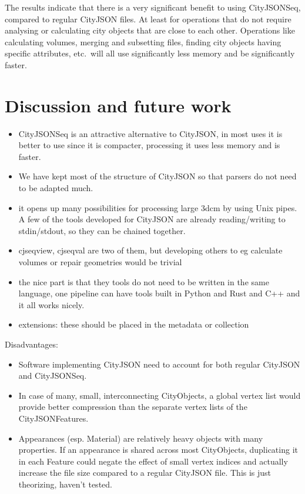 \documentclass{isprs} %
\begin{document}
The results indicate that there is a very significant benefit to using CityJSONSeq, compared to regular CityJSON files.
At least for operations that do not require analysing or calculating city objects that are close to each other.
Operations like calculating volumes, merging and subsetting files, finding city objects having specific attributes, etc.\ will all use significantly less memory and be significantly faster.


%
\section{Discussion and future work}%
\label{sec:discussion}

\begin{itemize}
  \item CityJSONSeq is an attractive alternative to CityJSON, in most uses it is better to use since it is compacter, processing it uses less memory and is faster.
  \item We have kept most of the structure of CityJSON so that parsers do not need to be adapted much.
  \item it opens up many possibilities for processing large 3dcm by using Unix pipes. A few of the tools developed for CityJSON are already reading/writing to stdin/stdout, so they can be chained together.
  \item cjseqview, cjseqval are two of them, but developing others to eg calculate volumes or repair geometries would be trivial
  \item the nice part is that they tools do not need to be written in the same language, one pipeline can have tools built in Python and Rust and C++ and it all works nicely.
  \item extensions: these should be placed in the metadata or collection
\end{itemize}

Disadvantages:
\begin{itemize}
  \item     Software implementing CityJSON need to account for both regular CityJSON and CityJSONSeq.
  \item  In case of many, small, interconnecting CityObjects, a global vertex list would provide better compression than the separate vertex lists of the CityJSONFeatures.
  \item  Appearances (esp. Material) are relatively heavy objects with many properties. If an appearance is shared across most CityObjects, duplicating it in each Feature could negate the effect of small vertex indices and actually increase the file size compared to a regular CityJSON file. This is just theorizing, haven't tested.
\end{itemize}


{
	\begin{spacing}{1.17}
		\normalsize
	\end{spacing}
}
\end{document}
